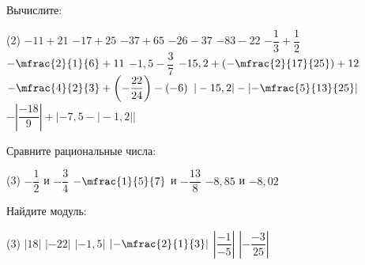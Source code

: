 \begin{homework}[number=2]
	\begin{listofex}
		\item Вычислите:
		\begin{tasks}(2)
			\task \( -11 + 21 \)
			\task \( -17+25 \)
			\task \( -37+65 \)
			\task \( -26-37 \)
			\task \( -83-22 \)
			\task \( -\dfrac{1}{3}+\dfrac{1}{2} \)
			\task \( -\mfrac{2}{1}{6}+11 \)
			\task \( -1,5-\dfrac{3}{7} \)
			\task \( -15,2 + \left(-\mfrac{2}{17}{25}\right) + 12 \)
			\task \( -\mfrac{4}{2}{3} + \left(-\dfrac{22}{24}\right) - (-6) \)
			\task \(  |-15,2|-\left|-\mfrac{5}{13}{25}\right| \)
			\task \(  -\left|\dfrac{-18}{9}\right| + |-7,5-|-1,2|| \)
		\end{tasks}
		\item Сравните рациональные числа:
		\begin{tasks}(3)
			\task \( -\dfrac{1}{2} \) и \( -\dfrac{3}{4} \)
			\task \( -\mfrac{1}{5}{7} \) и \( -\dfrac{13}{8} \)
			\task \( -8,85 \) и \( -8,02 \)
		\end{tasks}
		\item Найдите модуль:
		\begin{tasks}(3)
			\task \(  |18| \)
			\task \(  |-22| \)
			\task \( |-1,5|  \)
			\task \(  \left|-\mfrac{2}{1}{3}\right| \)
			\task \(  \left|\dfrac{-1}{-5}\right| \)
			\task \(  \left|-\dfrac{-3}{25}\right| \)
		\end{tasks}
	\end{listofex}
\end{homework}

